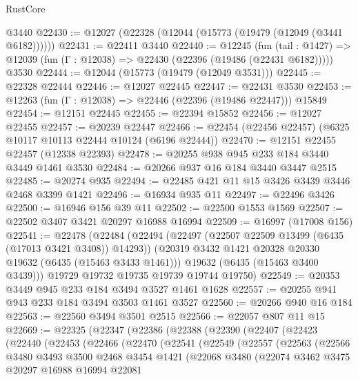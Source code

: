 \begin{lexlean}{RustCore}
\begin{coremodule}
    @3440
@22430 := @12027 (@22328 (@12044 (@15773 (@19479 (@12049 (@3441 @6182))))))
@22431 := @22411 @3440
@22440 := @12245
    (fun (tail : @1427) => @12039 (fun (Γ : @12038) => @22430 (@22396 (@19486 (@22431 @6182)))))
    @3530
@22444 := @12044 (@15773 (@19479 (@12049 @3531)))
@22445 := @22328 @22444
@22446 := @12027 @22445
@22447 := @22431 @3530
@22453 := @12263 (fun (Γ : @12038) => @22446 (@22396 (@19486 @22447))) @15849
@22454 := @12151 @22445
@22455 := @22394 @15852
@22456 := @12027 @22455
@22457 := @20239 @22447
@22466 := @22454 (@22456 @22457) (@6325 @10117 @10113 @22444 @10124 (@6196 @22444))
@22470 := @12151 @22455 @22457 (@12338 @22393)
@22478 := @20255 @938 @945 @233 @184 @3440 @3449 @1461 @3530
@22484 := @20266 @937 @16 @184 @3440 @3447 @2515
@22485 := @20274 @935
@22494 := @22485 @421 @11 @15 @3426 @3439 @3446 @2468 @3399 @1421
@22496 := @16934 @935 @11
@22497 := @22496 @3426
@22500 := @16946 @156 @39 @11
@22502 := @22500 @1553 @1569
@22507 := @22502 @3407 @3421 @20297 @16988 @16994
@22509 := @16997 (@17008 @156)
@22541 := @22478
    (@22484
      (@22494
        (@22497 (@22507 @22509 @13499 (@6435 (@17013 @3421 @3408)) @14293))
        (@20319 @3432 @1421 @20328 @20330 @19632 (@6435 (@15463 @3433 @1461)))
        @19632
        (@6435 (@15463 @3400 @3439)))
      @19729
      @19732
      @19735
      @19739
      @19744
      @19750)
@22549 := @20353 @3449 @945 @233 @184 @3494 @3527 @1461 @1628
@22557 := @20255 @941 @943 @233 @184 @3494 @3503 @1461 @3527
@22560 := @20266 @940 @16 @184
@22563 := @22560 @3494 @3501 @2515
@22566 := @22057 @807 @11 @15
@22669 := @22325
    (@22347
      (@22386
        (@22388
          (@22390
            (@22407
              (@22423
                (@22440
                  (@22453
                    (@22466
                      (@22470
                        (@22541
                          (@22549
                            (@22557
                              (@22563
                                (@22566
                                  @3480
                                  @3493
                                  @3500
                                  @2468
                                  @3454
                                  @1421
                                  (@22068
                                    @3480
                                    (@22074
                                      @3462
                                      @3475
                                      @20297
                                      @16988
                                      @16994
                                      @22081

\end{coremodule}
\end{lexlean}
